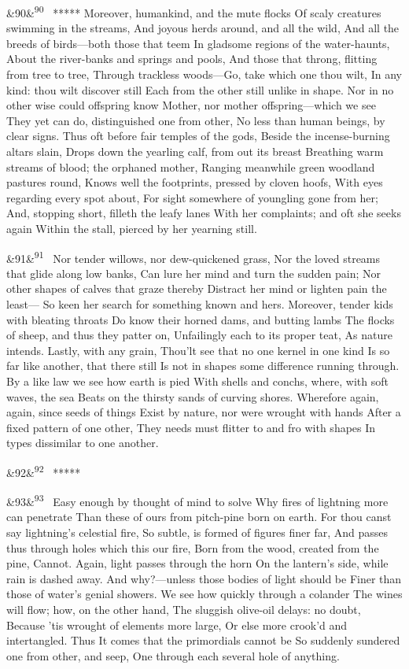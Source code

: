 \documentclass[12pt]{article}
\newcommand{\para}[1][]{\par\noindent\ifx&#1&\else\textsuperscript{\footnotesize #1}~\fi}
\begin{document}
\para[90] ***** Moreover, humankind, and the mute flocks Of scaly creatures swimming in the streams, And joyous herds around, and all the wild, And all the breeds of birds---both those that teem In gladsome regions of the water-haunts, About the river-banks and springs and pools, And those that throng, flitting from tree to tree, Through trackless woods---Go, take which one thou wilt, In any kind: thou wilt discover still Each from the other still unlike in shape. Nor in no other wise could offspring know Mother, nor mother offspring---which we see They yet can do, distinguished one from other, No less than human beings, by clear signs. Thus oft before fair temples of the gods, Beside the incense-burning altars slain, Drops down the yearling calf, from out its breast Breathing warm streams of blood; the orphaned mother, Ranging meanwhile green woodland pastures round, Knows well the footprints, pressed by cloven hoofs, With eyes regarding every spot about, For sight somewhere of youngling gone from her; And, stopping short, filleth the leafy lanes With her complaints; and oft she seeks again Within the stall, pierced by her yearning still.

\para[91] Nor tender willows, nor dew-quickened grass, Nor the loved streams that glide along low banks, Can lure her mind and turn the sudden pain; Nor other shapes of calves that graze thereby Distract her mind or lighten pain the least--- So keen her search for something known and hers. Moreover, tender kids with bleating throats Do know their horned dams, and butting lambs The flocks of sheep, and thus they patter on, Unfailingly each to its proper teat, As nature intends. Lastly, with any grain, Thou'lt see that no one kernel in one kind Is so far like another, that there still Is not in shapes some difference running through. By a like law we see how earth is pied With shells and conchs, where, with soft waves, the sea Beats on the thirsty sands of curving shores. Wherefore again, again, since seeds of things Exist by nature, nor were wrought with hands After a fixed pattern of one other, They needs must flitter to and fro with shapes In types dissimilar to one another.

\para[92] *****

\para[93] Easy enough by thought of mind to solve Why fires of lightning more can penetrate Than these of ours from pitch-pine born on earth. For thou canst say lightning's celestial fire, So subtle, is formed of figures finer far, And passes thus through holes which this our fire, Born from the wood, created from the pine, Cannot. Again, light passes through the horn On the lantern's side, while rain is dashed away. And why?---unless those bodies of light should be Finer than those of water's genial showers. We see how quickly through a colander The wines will flow; how, on the other hand, The sluggish olive-oil delays: no doubt, Because 'tis wrought of elements more large, Or else more crook'd and intertangled. Thus It comes that the primordials cannot be So suddenly sundered one from other, and seep, One through each several hole of anything.
\end{document}
